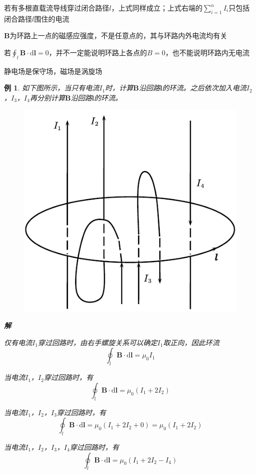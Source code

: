 \documentclass[12pt, a4paper, twoside]{ctexbook}
\newtheorem{example}[theorem]{例}
\begin{document}
若有多根直载流导线穿过闭合路径$l$，上式同样成立；上式右端的$\sum\limits_{i=1}^{n}I_i$只包括闭合路径$l$围住的电流

$\boldsymbol{B}$为环路上一点的磁感应强度，不是任意点的，其与环路内外电流均有关

若$\oint_l\boldsymbol{B}\cdot\mathrm{d}\boldsymbol{l}=0$，并不一定能说明环路上各点的$B=0$，也不能说明环路内无电流

静电场是保守场，磁场是涡旋场
\begin{example}
    如下图所示，当只有电流$I_1$时，计算$\boldsymbol{B}$沿回路$\boldsymbol{l}$的环流。之后依次加入电流$I_2$，$I_3$，$I_4$再分别计算$\boldsymbol{B}$沿回路$\boldsymbol{l}$的环流。
    \begin{figure}[H]
        \centerline{\includegraphics[scale=0.88]{CH10EX03.pdf}}
    \end{figure}

    \noindent\textbf{解}

    仅有电流$I_1$穿过回路时，由右手螺旋关系可以确定$I_1$取正向，因此环流
    $$
    \oint_l\boldsymbol{B}\cdot\mathrm{d}\boldsymbol{l}=\mu_0I_1
    $$

    当电流$I_1$，$I_2$穿过回路时，有
    $$
    \oint_l\boldsymbol{B}\cdot\mathrm{d}\boldsymbol{l}=\mu_0(I_1+2I_2)
    $$

    当电流$I_1$，$I_2$，$I_3$穿过回路时，有
    $$
    \oint_l\boldsymbol{B}\cdot\mathrm{d}\boldsymbol{l}=\mu_0(I_1+2I_2+0)=\mu_0(I_1+2I_2)
    $$

    当电流$I_1$，$I_2$，$I_3$，$I_4$穿过回路时，有
    $$
    \oint_l\boldsymbol{B}\cdot\mathrm{d}\boldsymbol{l}=\mu_0(I_1+2I_2-I_4)
    $$
\end{example}
\end{document}

